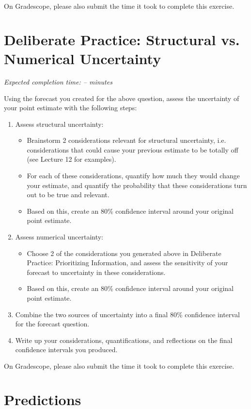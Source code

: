 \documentclass[11pt]{article}
\begin{document}
On Gradescope, please also submit the time it took to complete this exercise.

\section*{Deliberate Practice: Structural vs. Numerical Uncertainty}


\emph{Expected completion time: -- minutes}

Using the forecast you created for the above question, assess the uncertainty of your point estimate with the following steps:
\begin{enumerate}
	\item Assess structural uncertainty:
	\begin{itemize}
		\item Brainstorm 2 considerations relevant for structural uncertainty, i.e. considerations that could cause your previous estimate to be totally off (see Lecture 12 for examples).
		\item For each of these considerations, quantify how much they would change your estimate, and quantify the probability that these considerations turn out to be true and relevant.
		\item Based on this, create an 80\% confidence interval around your original point estimate.
	\end{itemize}
	
	\item Assess numerical uncertainty:
	\begin{itemize}
		\item Choose 2 of the considerations you generated above in Deliberate Practice: Prioritizing Information, and assess the sensitivity of your forecast to uncertainty in these considerations.
		\item Based on this, create an 80\% confidence interval around your original point estimate.   
	\end{itemize}
	
	\item Combine the two sources of uncertainty into a final 80\% confidence interval for the forecast question.
	\item Write up your considerations, quantifications, and reflections on the final confidence intervals you produced.
\end{enumerate}


On Gradescope, please also submit the time it took to complete this exercise.

\section*{Predictions}
\end{document}
